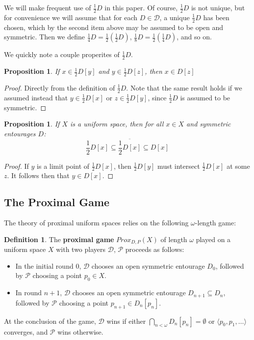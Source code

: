 \documentclass{amsart}
\newtheorem{prop}[thm]{Proposition}
\theoremstyle{definition}
\newtheorem{defn}[thm]{Definition}
\theoremstyle{remark}
\newcommand{\<}{\langle}
\renewcommand{\>}{\rangle}
\newcommand{\cl}[1]{\overline{#1}}
\newcommand{\proxgame}[1]{Prox_{D,P}(#1)}
\newcommand{\pl}[1]{\mathscr{#1}}
\begin{document}
We will make frequent use of $\frac{1}{2}D$ in this paper.  Of course, $\frac{1}{2}D$ is not unique, but for convenience we will assume that for each $D\in \mathcal D$, a unique $\frac{1}{2}D$ has been chosen, which  by the second item above may be assumed to be open and symmetric.  Then we define $\frac{1}{4}D=\frac{1}{2}(\frac{1}{2}D)$,
$\frac{1}{8}D=\frac{1}{2}(\frac{1}{4}D)$, and so on.

We quickly note a couple properites of $\frac{1}{2}D$.

\begin{prop}
  If $x\in \frac{1}{2}D[y]$ and $y\in \frac{1}{2}D[z]$, then $x\in D[z]$
\end{prop}

\begin{proof}
  Directly from the definition of $\frac{1}{2}D$. Note that the same result holds if we assumed instead that $y\in \frac{1}{2}D[x]$ or $z\in \frac{1}{2}D[y]$, since $\frac{1}{2}D$ is assumed to be symmetric.
\end{proof}

\begin{prop}
  If $X$ is a uniform space, then for all $x\in X$ and symmetric entourages $D$:
    \[
      \frac{1}{2}D[x]\subseteq \cl{\frac{1}{2}D[x]}\subseteq D[x]
    \]
\end{prop}

\begin{proof}
  If $y$ is a limit point of $\frac{1}{2}D[x]$, then $\frac{1}{2}D[y]$ must intersect $\frac{1}{2}D[x]$ at some $z$. It follows then that $y\in D[x]$.
\end{proof}

\subsection{The Proximal Game}

The theory of proximal uniform spaces relies on the following $\omega$-length game:

\begin{defn}
  The \textbf{proximal game} $\proxgame{X}$ of length $\omega$ played on a uniform space $X$ with two players $\pl D$, $\pl P$ proceeds as follows:
    \begin{itemize}
      \item In the initial round $0$, $\pl D$ chooses an open symmetric entourage $D_0$, followed by $\pl P$ choosing a point $p_0\in X$.
      \item In round $n+1$, $\pl D$ chooses an open symmetric entourage $D_{n+1}\subseteq D_n$, followed by $\pl P$ choosing a point $p_{n+1}\in D_n[p_n]$.
    \end{itemize}
  At the conclusion of the game, $\pl D$ wins if either $\bigcap_{n<\omega}D_n[p_n]=\emptyset$ or $\<p_0,p_1,\dots\>$ converges, and $\pl P$ wins otherwise.
\end{defn}
\end{document}
